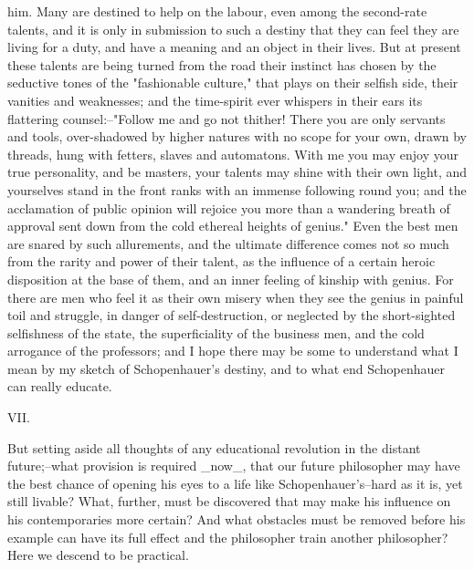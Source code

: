 him. Many are destined to help on the labour, even among the
second-rate talents, and it is only in submission to such a destiny
that they can feel they are living for a duty, and have a meaning and
an object in their lives. But at present these talents are being
turned from the road their instinct has chosen by the seductive tones
of the "fashionable culture," that plays on their selfish side, their
vanities and weaknesses; and the time-spirit ever whispers in their
ears its flattering counsel:--"Follow me and go not thither! There
you are only servants and tools, over-shadowed by higher natures with
no scope for your own, drawn by threads, hung with fetters, slaves
and automatons. With me you may enjoy your true personality, and be
masters, your talents may shine with their own light, and yourselves
stand in the front ranks with an immense following round you; and the
acclamation of public opinion will rejoice you more than a wandering
breath of approval sent down from the cold ethereal heights of
genius." Even the best men are snared by such allurements, and the
ultimate difference comes not so much from the rarity and power of
their talent, as the influence of a certain heroic disposition at the
base of them, and an inner feeling of kinship with genius. For there
are men who feel it as their own misery when they see the genius in
painful toil and struggle, in danger of self-destruction, or
neglected by the short-sighted selfishness of the state, the
superficiality of the business men, and the cold arrogance of the
professors; and I hope there may be some to understand what I mean by
my sketch of Schopenhauer's destiny, and to what end Schopenhauer can
really educate.


VII.

But setting aside all thoughts of any educational revolution in the
distant future;--what provision is required _now_, that our future
philosopher may have the best chance of opening his eyes to a life
like Schopenhauer's--hard as it is, yet still livable? What, further,
must be discovered that may make his influence on his contemporaries
more certain? And what obstacles must be removed before his example
can have its full effect and the philosopher train another
philosopher? Here we descend to be practical.

